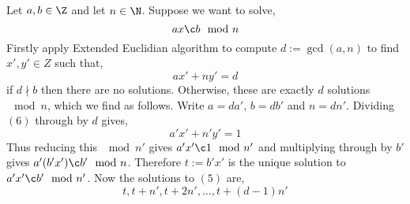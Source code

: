 \begin{algorithm}
  Let $a, b \in \Z$ and let $n \in \N$. Suppose we want to solve,
  \begin{equation}
    ax \c b \mod n
  \end{equation}
  Firstly apply Extended Euclidian algorithm to compute $d := \gcd(a, n)$ to find $x', y' \in Z$ such that,
  \begin{equation}
    ax' + ny' = d
  \end{equation}
  if $d \nmid b$ then there are no solutions. Otherwise, these are exactly $d$ solutions $\mod n$, which we find as follows. Write $a = da'$, $b = db'$ and $n = dn'$. Dividing $(6)$ through by $d$ gives,
  \begin{equation}
    a'x' + n'y' = 1
  \end{equation}
  Thus reducing this $\mod n'$ gives $a'x' \c 1 \mod n'$ and multiplying through by $b'$ gives $a'(b'x') \c b' \mod n$. Therefore $t := b'x'$ is the unique solution to $a'x' \c b' \mod n'$. Now the solutions to $(5)$ are,
  $$ t, t+n', t + 2n', \dots, t + (d - 1)n' $$
\end{algorithm}

